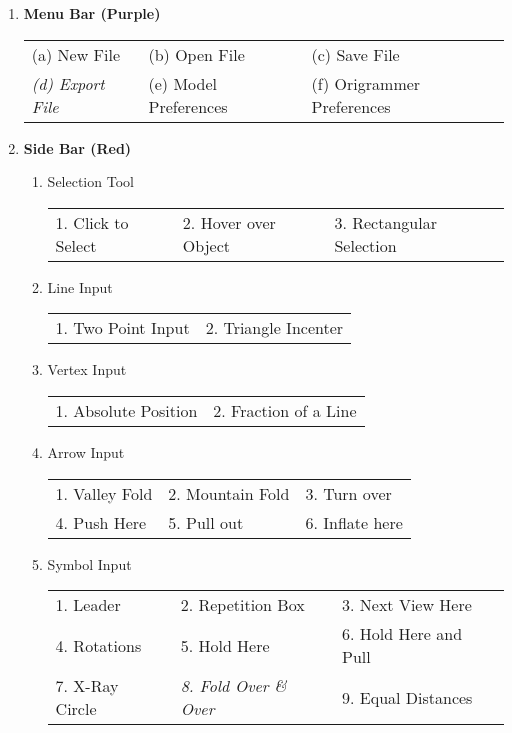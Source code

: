 \begin{enumerate}
\item \textbf{Menu Bar (Purple)}

\begin{tabular}{l l l}
(a) New File & (b) Open File & (c) Save File \\
\emph{(d) Export File} & (e) Model Preferences & (f) Origrammer Preferences \\
\end{tabular}

\item \textbf{Side Bar (Red)}
    \begin{enumerate}
        \item Selection Tool \\
        \begin{tabular}{l l l}
        1. Click to Select & 2. Hover over Object & 3. Rectangular Selection \\
        \end{tabular}
        \item Line Input \\
        \begin{tabular}{l l}
        1. Two Point Input & 2. Triangle Incenter \\
        \end{tabular}
        \item Vertex Input \\
        \begin{tabular}{l l}
        1. Absolute Position & 2. Fraction of a Line \\
        \end{tabular}
        \item Arrow Input \\
        \begin{tabular}{l l l}
        1. Valley Fold & 2. Mountain Fold & 3. Turn over \\
        4. Push Here & 5. Pull out & 6. Inflate here \\
        \end{tabular}
        \item Symbol Input \\
        \begin{tabular}{l l l}
        1. Leader & 2. Repetition Box & 3. Next View Here \\
        4. Rotations & 5. Hold Here & 6. Hold Here and Pull \\
        7. X-Ray Circle & \emph{8. Fold Over \& Over} & 9. Equal Distances \\

\end{tabular}
\end{enumerate}
\end{enumerate}
